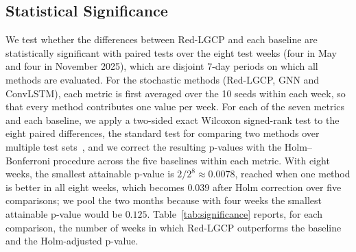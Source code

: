 \subsection{Statistical Significance}
\label{app:significance}

We test whether the differences between Red-LGCP and each baseline are statistically significant with paired tests over the eight test weeks (four in May and four in November 2025), which are disjoint 7-day periods on which all methods are evaluated. For the stochastic methods (Red-LGCP, GNN and ConvLSTM), each metric is first averaged over the 10 seeds within each week, so that every method contributes one value per week. For each of the seven metrics and each baseline, we apply a two-sided exact Wilcoxon signed-rank test to the eight paired differences, the standard test for comparing two methods over multiple test sets~\citep{demsar2006statistical}, and we correct the resulting p-values with the Holm--Bonferroni procedure across the five baselines within each metric. With eight weeks, the smallest attainable p-value is $2/2^8\approx0.0078$, reached when one method is better in all eight weeks, which becomes $0.039$ after Holm correction over five comparisons; we pool the two months because with four weeks the smallest attainable p-value would be $0.125$. Table~\ref{tab:significance} reports, for each comparison, the number of weeks in which Red-LGCP outperforms the baseline and the Holm-adjusted p-value.

